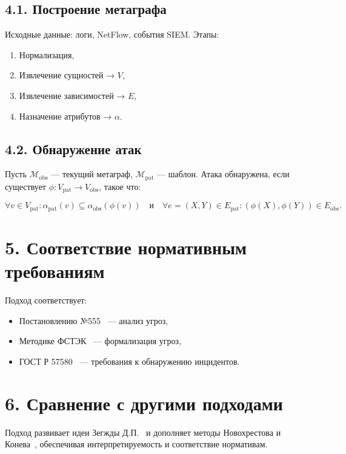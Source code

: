 \documentclass[12pt,a4paper]{article}
\begin{document}
\subsection*{4.1. Построение метаграфа}
Исходные данные: логи, NetFlow, события SIEM. Этапы:
\begin{enumerate}
    \item Нормализация,
    \item Извлечение сущностей → $V$,
    \item Извлечение зависимостей → $E$,
    \item Назначение атрибутов → $\alpha$.
\end{enumerate}

\subsection*{4.2. Обнаружение атак}

Пусть $\mathcal{M}_{\text{obs}}$ — текущий метаграф, $\mathcal{M}_{\text{pat}}$ — шаблон. Атака обнаружена, если существует $\phi: V_{\text{pat}} \to V_{\text{obs}}$, такое что:

\begin{equation}
\forall v \in V_{\text{pat}}: \alpha_{\text{pat}}(v) \subseteq \alpha_{\text{obs}}(\phi(v)) \quad \text{и} \quad \forall e = (X,Y) \in E_{\text{pat}}: (\phi(X), \phi(Y)) \in E_{\text{obs}}.
\end{equation}

\section*{5. Соответствие нормативным требованиям}

Подход соответствует:
\begin{itemize}
    \item Постановлению №555~\cite{post555} — анализ угроз,
    \item Методике ФСТЭК~\cite{fsteck2015} — формализация угроз,
    \item ГОСТ Р 57580~\cite{gost57580} — требования к обнаружению инцидентов.
\end{itemize}

\section*{6. Сравнение с другими подходами}

Подход развивает идеи Зегжды Д.П.~\cite{zegzhda2016,zegzhda2017} и дополняет методы Новохрестова и Конева~\cite{novokhrestov2014}, обеспечивая интерпретируемость и соответствие нормативам.
\end{document}
